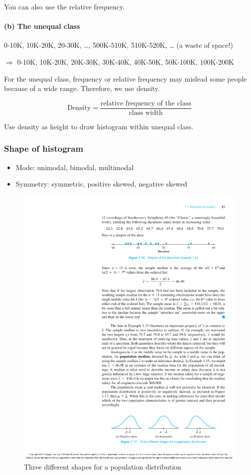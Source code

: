 You can also use the relative frequency.

\paragraph{(b) The unequal class}
\begin{exmp}
  0-10K, 10K-20K, 20-30K, \dots, 500K-510K, 510K-520K, \dots 
  (a waste of space!) 
  
  $\Rightarrow $  0-10K, 10K-20K, 20K-30K, 30K-40K, 40K-50K,  50K-100K, 100K-200K
\end{exmp}

For the unequal class, frequency or relative frequency may mislead some people because of a wide range. Therefore, we use density.

\[ \text{Density} = \frac{\text{relative frequency of the class}}{\text{class width}}	\]

Use density as height to draw histogram within unequal class.
\subsubsection{Shape of histogram}
\begin{itemize}
  \item Mode: unimodal, bimodal, multimodal
  \item Symmetry: symmetric, positive skewed, negative skewed
\end{itemize}

\begin{figure}[H]
\centering
\includegraphics{figures/shape_histogram.pdf}
\caption{Three different shapes for a population distribution}
\label{fig:2}
\end{figure}

